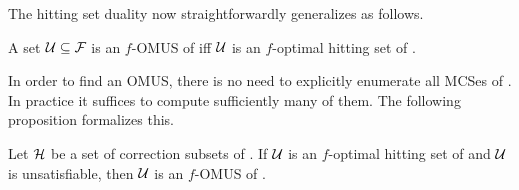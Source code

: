 The hitting set duality now straightforwardly generalizes as follows. 

\begin{proposition}\label{prop:optimal-hitting-set}
  A set $\mathcal{U} \subseteq \mathcal{F} $ is an $f$-OMUS of \formula iff $\mathcal{U}$ is an $f$-optimal hitting set of \mcses{\formula}.
\end{proposition}
 
In order to find an OMUS, there is no need to explicitly enumerate all MCSes of \formula. In practice it suffices to compute sufficiently many of them. 
The following proposition formalizes this. 
% 

\begin{proposition}\label{prop:K}
  Let $\mathcal{H}$ be a set of correction subsets of \mcses{\formula}. 
  If $\mathcal{U}$ is an $f$-optimal hitting set of  and $\mathcal{U}$ is unsatisfiable, then $\mathcal{U}$ is an $f$-OMUS of \formula. 
\end{proposition}



